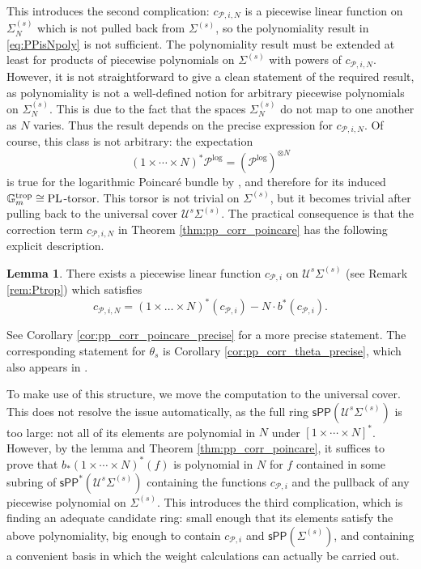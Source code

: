 \documentclass[11pt]{article}
\def\P{\mathcal{P}}
\def\PL{\mathrm{PL}}
\renewcommand{\log}{\mathrm{log}}
\newcommand{\sPP}{\mathsf{sPP}}
\newcommand{\spp}{\sPP}
\theoremstyle{definition}
\newtheorem{lemma}[definition]{Lemma}
\begin{document}
This introduces the second complication: $c_{\P,i,N}$ is a piecewise linear function
on $\Sigma_{N}^{(s)}$ which is not pulled back from $\Sigma^{(s)}$, so the
polynomiality result in \eqref{eq:PPisNpoly} is not sufficient. The polynomiality result
must be extended at least for products of piecewise polynomials on
$\Sigma^{(s)}$ with powers of $c_{\P,i,N}$. However, it is not straightforward to
give a clean statement of the required result, as polynomiality is not a well-defined notion for
arbitrary piecewise polynomials on $\Sigma_N^{(s)}$. This is due to the fact that the spaces
$\Sigma_N^{(s)}$ do not map to one another as $N$ varies.
Thus the result depends on the precise expression for
$c_{\P,i,N}$. Of course, this class is not arbitrary: the expectation
\[
(1 \times \cdots \times N)^*\mathcal{P}^{\log} =(\mathcal{P}^{\log})^{\otimes N}
\]
is true for the logarithmic Poincar\'e bundle by \cite[Theorem 4.4.1]{Molcho_Wise_2022}, and therefore for its induced
$\mathbb{G}_m^{\textup{trop}}\cong \PL$-torsor. This torsor is not trivial on
$\Sigma^{(s)}$, but it becomes trivial after pulling back to the universal
cover $\mathcal{U}^{s}\Sigma^{(s)}$. The practical consequence is that the
correction term $c_{\mathcal P,i,N}$ in Theorem \ref{thm:pp_corr_poincare} has
the following explicit description.

\begin{lemma}\label{lem:cPi}
    There exists a piecewise linear function $c_{\mathcal P,i}$ on $\mathcal U^{s}\Sigma^{(s)}$ (see Remark \ref{rem:Ptrop}) which
    satisfies
    \[
    c_{\mathcal P,i,N} = (1\times\dots\times N)^{\ast}(c_{\mathcal P,i})-N\cdot b^{\ast}(c_{\mathcal P,i}).
    \]
\end{lemma}

See Corollary \ref{cor:pp_corr_poincare_precise} for a more precise statement. The corresponding statement for $\theta_s$ is Corollary \ref{cor:pp_corr_theta_precise}, which also appears in \cite{BGHdJ}.

To make use of this structure, we move the computation to the universal cover. This does not resolve the issue automatically, as the full ring $\spp(\mathcal{U}^s\Sigma^{(s)})$ is too large: not all of its elements are polynomial in $N$ under $[1 \times \cdots \times N]^*$. However, by the lemma and Theorem \ref{thm:pp_corr_poincare}, it suffices to prove that $b_*(1\times \cdots \times N)^*(f)$ is polynomial in $N$
for $f$ contained in some subring of $\spp^{\ast}(\mathcal U^{s}\Sigma^{(s)})$
containing the functions $c_{\mathcal P,i}$ and the pullback of any piecewise
polynomial on $\Sigma^{(s)}$. This introduces the third complication, which is
finding an adequate candidate ring: small enough that its elements satisfy the above polynomiality, big enough to contain $c_{\mathcal P,i}$ and $\sPP(\Sigma^{(s)})$, and containing a convenient basis in which the weight calculations can actually be carried out.
\end{document}
